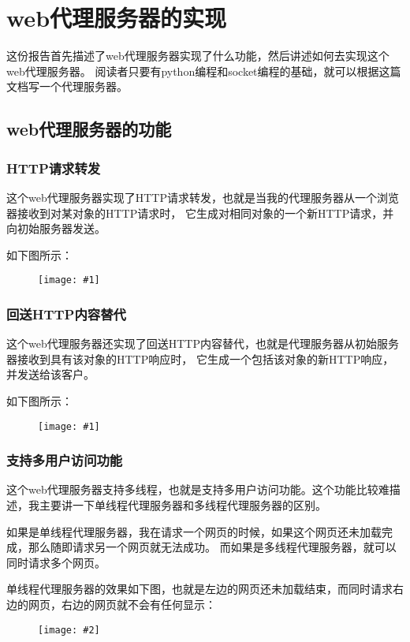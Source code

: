 \documentclass[a4paper,left=2.5cm,right=2.5cm,11pt]{article}
\newcommand{\fic}[1]{\begin{figure}[H]
		\center
		\texttt{[image: \#1]}
	\end{figure}}
\newcommand{\sizedfic}[2]{\begin{figure}[H]
		\center
		\texttt{[image: \#2]}
	\end{figure}}
\begin{document}
\tableofcontents

\clearpage

\section{web代理服务器的实现}
	这份报告首先描述了web代理服务器实现了什么功能，然后讲述如何去实现这个web代理服务器。
	阅读者只要有python编程和socket编程的基础，就可以根据这篇文档写一个代理服务器。

\subsection{web代理服务器的功能}
\subsubsection{HTTP请求转发}
	这个web代理服务器实现了HTTP请求转发，也就是当我的代理服务器从一个浏览器接收到对某对象的HTTP请求时，
	它生成对相同对象的一个新HTTP请求，并向初始服务器发送。\par

	如下图所示：
	\fic{1.png}

\clearpage

\subsubsection{回送HTTP内容替代}
	这个web代理服务器还实现了回送HTTP内容替代，也就是代理服务器从初始服务器接收到具有该对象的HTTP响应时，
	它生成一个包括该对象的新HTTP响应，并发送给该客户。\par

	如下图所示：
	\fic{2.png}

\clearpage

\subsubsection{支持多用户访问功能}
	这个web代理服务器支持多线程，也就是支持多用户访问功能。这个功能比较难描述，我主要讲一下单线程代理服务器和多线程代理服务器的区别。\par

	如果是单线程代理服务器，我在请求一个网页的时候，如果这个网页还未加载完成，那么随即请求另一个网页就无法成功。
	而如果是多线程代理服务器，就可以同时请求多个网页。\par

	单线程代理服务器的效果如下图，也就是左边的网页还未加载结束，而同时请求右边的网页，右边的网页就不会有任何显示：
	\sizedfic{0.7}{4.png}
\end{document}
